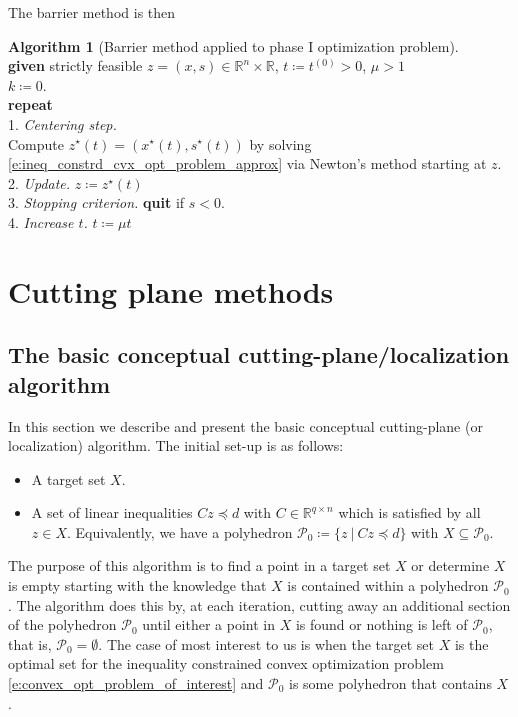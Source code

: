 \documentclass[11pt]{amsart}
\theoremstyle{definition}
\newtheorem{algorithm}{Algorithm}[section]
\theoremstyle{remark}
\newcommand{\ind}{\hspace*{0.5cm}}
\begin{document}
        The barrier method is then
         \begin{algorithm}[Barrier method applied to phase I optimization problem]
        \label{a:basic_conceptual_cp_alg}\mbox{}\\
            \ind \textbf{given} strictly feasible $z = (x, s) \in \mathbb{R}^n \times \mathbb{R}$, $t \coloneqq t^{(0)} > 0$, $\mu > 1$ \\
            \ind $k \coloneqq 0$. \\
            \ind \textbf{repeat} \\
            \ind\ind 1. \emph{Centering step.} \\
            \ind\ind\ind Compute $z^\star(t) = (x^\star(t), s^\star(t))$ by solving \eqref{e:ineq_constrd_cvx_opt_problem_approx} via Newton's method starting at $z$. \\
            \ind\ind 2. \emph{Update.} $z \coloneqq z^\star(t)$ \\
            \ind\ind 3. \emph{Stopping criterion.} \textbf{quit} if $s < 0$. \\
            \ind\ind 4. \emph{Increase $t$.} $t \coloneqq \mu t$
        \end{algorithm}


\section{Cutting plane methods}
    \subsection{The basic conceptual cutting-plane/localization algorithm}
        In this section we describe and present the basic conceptual cutting-plane (or localization) algorithm. The initial set-up is as follows:
        \begin{itemize}
            \item A target set $X$.
            \item A set of linear inequalities $Cz \preceq d$ with $C \in \mathbb{R}^{q \times n}$ which is satisfied by all $z \in X$. Equivalently, we have a polyhedron $\mathcal{P}_0 \coloneqq \{ z \:|\: Cz \preceq d\}$ with $X \subseteq \mathcal{P}_0$. 
        \end{itemize}
        The purpose of this algorithm is to find a point in a target set $X$ or determine $X$ is empty starting with the knowledge that $X$ is contained within a polyhedron $\mathcal{P}_0$. The algorithm does this by, at each iteration, cutting away an additional section of the polyhedron $\mathcal{P}_0$ until either a point in $X$ is found or nothing is left of $\mathcal{P}_0$, that is, $\mathcal{P}_0 = \emptyset$. The case of most interest to us is when the target set $X$ is the optimal set for the inequality constrained convex optimization problem \eqref{e:convex_opt_problem_of_interest} and $\mathcal{P}_0$ is some polyhedron that contains $X$.
\end{document}
